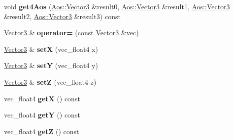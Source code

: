 \begin{DoxyCompactItemize}
\item 
\hypertarget{classVectormath_1_1Soa_1_1Vector3_a324c1d0d4bb3d5d6e42ec7dde14363e1}{void {\bfseries get4\-Aos} (\hyperlink{classVectormath_1_1Aos_1_1Vector3}{Aos\-::\-Vector3} \&result0, \hyperlink{classVectormath_1_1Aos_1_1Vector3}{Aos\-::\-Vector3} \&result1, \hyperlink{classVectormath_1_1Aos_1_1Vector3}{Aos\-::\-Vector3} \&result2, \hyperlink{classVectormath_1_1Aos_1_1Vector3}{Aos\-::\-Vector3} \&result3) const }\label{classVectormath_1_1Soa_1_1Vector3_a324c1d0d4bb3d5d6e42ec7dde14363e1}

\item 
\hypertarget{classVectormath_1_1Soa_1_1Vector3_a034e9a948f111085b382127f8f8e34e4}{\hyperlink{classVectormath_1_1Soa_1_1Vector3}{Vector3} \& {\bfseries operator=} (const \hyperlink{classVectormath_1_1Soa_1_1Vector3}{Vector3} \&vec)}\label{classVectormath_1_1Soa_1_1Vector3_a034e9a948f111085b382127f8f8e34e4}

\item 
\hypertarget{classVectormath_1_1Soa_1_1Vector3_a0dfaabb000ed186ad2e36665eda9ce0b}{\hyperlink{classVectormath_1_1Soa_1_1Vector3}{Vector3} \& {\bfseries set\-X} (vec\-\_\-float4 x)}\label{classVectormath_1_1Soa_1_1Vector3_a0dfaabb000ed186ad2e36665eda9ce0b}

\item 
\hypertarget{classVectormath_1_1Soa_1_1Vector3_ae098e41f5f57eb4a5f871e6d6d77c26d}{\hyperlink{classVectormath_1_1Soa_1_1Vector3}{Vector3} \& {\bfseries set\-Y} (vec\-\_\-float4 y)}\label{classVectormath_1_1Soa_1_1Vector3_ae098e41f5f57eb4a5f871e6d6d77c26d}

\item 
\hypertarget{classVectormath_1_1Soa_1_1Vector3_a603cf94e5585cf9352a9b31be491f3e4}{\hyperlink{classVectormath_1_1Soa_1_1Vector3}{Vector3} \& {\bfseries set\-Z} (vec\-\_\-float4 z)}\label{classVectormath_1_1Soa_1_1Vector3_a603cf94e5585cf9352a9b31be491f3e4}

\item 
\hypertarget{classVectormath_1_1Soa_1_1Vector3_a2f6157ae5a1db067e5f3f0790a824730}{vec\-\_\-float4 {\bfseries get\-X} () const }\label{classVectormath_1_1Soa_1_1Vector3_a2f6157ae5a1db067e5f3f0790a824730}

\item 
\hypertarget{classVectormath_1_1Soa_1_1Vector3_a4776125d80723b46e9be7ce8eb931f8f}{vec\-\_\-float4 {\bfseries get\-Y} () const }\label{classVectormath_1_1Soa_1_1Vector3_a4776125d80723b46e9be7ce8eb931f8f}

\item 
\hypertarget{classVectormath_1_1Soa_1_1Vector3_a7e2c50267eb7a53732851c1dde6e35c3}{vec\-\_\-float4 {\bfseries get\-Z} () const }\label{classVectormath_1_1Soa_1_1Vector3_a7e2c50267eb7a53732851c1dde6e35c3}


\end{DoxyCompactItemize}
